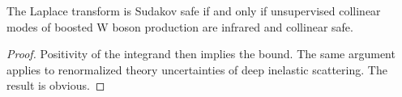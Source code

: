 \begin{theorem}\label{thm:2}
The Laplace transform is Sudakov safe if and only if unsupervised
collinear modes of boosted W boson production are infrared and collinear
safe.
\end{theorem}

\begin{proof}
Positivity of the integrand then implies the bound. The same argument
applies to renormalized theory uncertainties of deep inelastic
scattering. The result is obvious.
\end{proof}

